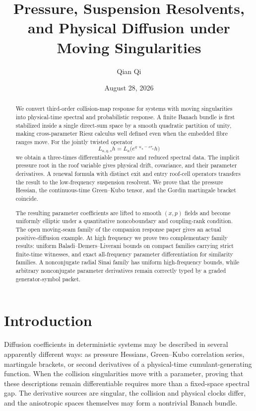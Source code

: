 \documentclass[11pt,reqno]{amsart}
\title[Pressure and physical diffusion]{Pressure, Suspension Resolvents, and Physical Diffusion under Moving Singularities}
\author{Qian Qi}
\date{August 28, 2026}
\theoremstyle{definition}
\theoremstyle{remark}
\begin{document}
\begin{abstract}
We convert third-order collision-map response for systems with moving
singularities into physical-time spectral and probabilistic response.  A
finite Banach bundle is first stabilized inside a single direct-sum space by a
smooth quadratic partition of unity, making cross-parameter Riesz calculus
well defined even when the embedded fibre ranges move.  For the jointly twisted
operator
\[
 L_{a,q,s}h=L_a\bigl(e^{q\cdot\kappa_a-s\tau_a}h\bigr)
\]
we obtain a three-times differentiable pressure and reduced spectral data.  The
implicit pressure root in the roof variable gives physical drift, covariance,
and their parameter derivatives.  A renewal formula with distinct exit and
entry roof-cell operators transfers the result to the low-frequency suspension
resolvent.  We prove that the pressure Hessian, the continuous-time
Green--Kubo tensor, and the Gordin martingale bracket coincide.

The resulting parameter coefficients are lifted to smooth $(x,p)$ fields and
become uniformly elliptic under a quantitative noncoboundary and coupling-rank
condition.  The open moving-seam family of the companion response paper gives
an actual positive-diffusion example.  At high frequency we prove two
complementary family results: uniform Baladi--Demers--Liverani bounds on compact
families carrying strict finite-time witnesses, and exact all-frequency
parameter differentiation for similarity families.  A nonconjugate radial
Sinai family has uniform high-frequency bounds, while arbitrary
nonconjugate parameter derivatives remain correctly typed by a graded
generator-symbol packet.
\end{abstract}

\maketitle
\tableofcontents

\section{Introduction}

Diffusion coefficients in deterministic systems may be described in several
apparently different ways: as pressure Hessians, Green--Kubo correlation
series, martingale brackets, or second derivatives of a physical-time
cumulant-generating function.  When the collision singularities move with a
parameter, proving that these descriptions remain differentiable requires more
than a fixed-space spectral gap.  The derivative sources are singular, the
collision and physical clocks differ, and the anisotropic spaces themselves
may form a nontrivial Banach bundle.
\end{document}
